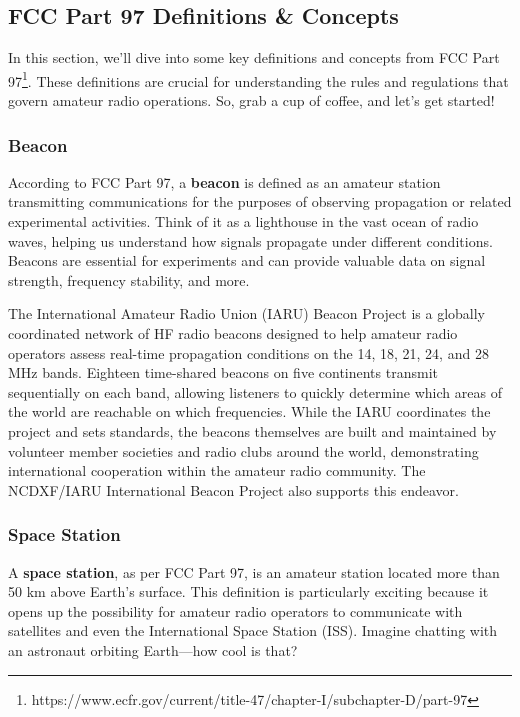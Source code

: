 \subsection{FCC Part 97 Definitions \& Concepts}
\label{subsec:fcc-definitions}

In this section, we'll dive into some key definitions and concepts from FCC Part 97\footnote{https://www.ecfr.gov/current/title-47/chapter-I/subchapter-D/part-97}. These definitions are crucial for understanding the rules and regulations that govern amateur radio operations. So, grab a cup of coffee, and let's get started!

\subsubsection*{Beacon}
According to FCC Part 97, a \textbf{beacon} is defined as an amateur station transmitting communications for the purposes of observing propagation or related experimental activities. Think of it as a lighthouse in the vast ocean of radio waves, helping us understand how signals propagate under different conditions. Beacons are essential for experiments and can provide valuable data on signal strength, frequency stability, and more.

The International Amateur Radio Union (IARU) Beacon Project is a globally coordinated network of HF radio beacons designed to help amateur radio operators assess real-time propagation conditions on the 14, 18, 21, 24, and 28 MHz bands.  Eighteen time-shared beacons on five continents transmit sequentially on each band, allowing listeners to quickly determine which areas of the world are reachable on which frequencies. While the IARU coordinates the project and sets standards, the beacons themselves are built and maintained by volunteer member societies and radio clubs around the world, demonstrating international cooperation within the amateur radio community. The NCDXF/IARU International Beacon Project also supports this endeavor.

\subsubsection*{Space Station}
A \textbf{space station}, as per FCC Part 97, is an amateur station located more than 50 km above Earth's surface. This definition is particularly exciting because it opens up the possibility for amateur radio operators to communicate with satellites and even the International Space Station (ISS). Imagine chatting with an astronaut orbiting Earth—how cool is that?

